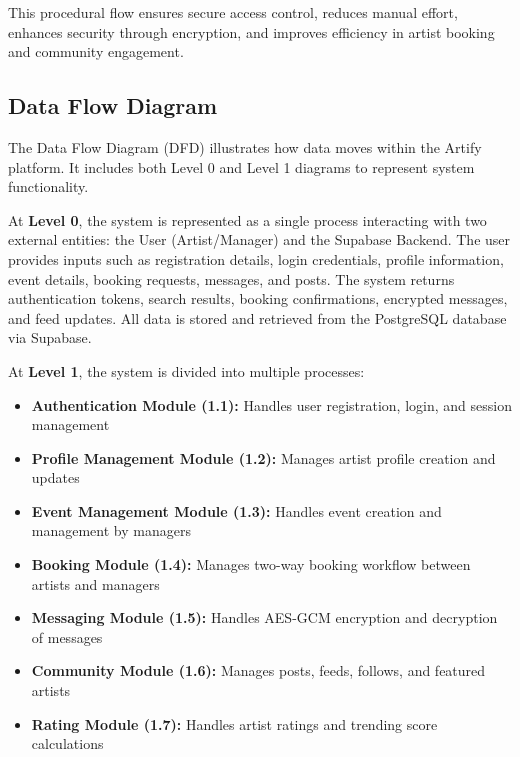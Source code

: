 \documentclass[12pt,a4paper]{report}
\begin{document}
This procedural flow ensures secure access control, reduces manual effort, enhances security through encryption, and improves efficiency in artist booking and community engagement.

\vspace{0.5cm}

\subsection*{Data Flow Diagram}

The Data Flow Diagram (DFD) illustrates how data moves within the Artify platform. It includes both Level 0 and Level 1 diagrams to represent system functionality.

At \textbf{Level 0}, the system is represented as a single process interacting with two external entities: the User (Artist/Manager) and the Supabase Backend. The user provides inputs such as registration details, login credentials, profile information, event details, booking requests, messages, and posts. The system returns authentication tokens, search results, booking confirmations, encrypted messages, and feed updates. All data is stored and retrieved from the PostgreSQL database via Supabase.

At \textbf{Level 1}, the system is divided into multiple processes:

\begin{itemize}
\item \textbf{Authentication Module (1.1):} Handles user registration, login, and session management
\item \textbf{Profile Management Module (1.2):} Manages artist profile creation and updates
\item \textbf{Event Management Module (1.3):} Handles event creation and management by managers
\item \textbf{Booking Module (1.4):} Manages two-way booking workflow between artists and managers
\item \textbf{Messaging Module (1.5):} Handles AES-GCM encryption and decryption of messages
\item \textbf{Community Module (1.6):} Manages posts, feeds, follows, and featured artists
\item \textbf{Rating Module (1.7):} Handles artist ratings and trending score calculations
\end{itemize}
\end{document}
